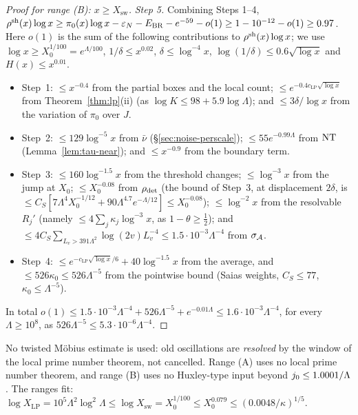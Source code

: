 \begin{proof}[Proof for range \textup{(B)}: $x\ge X_{\mathrm{sw}}$]
\emph{Step 5.} Combining Steps 1--4,
$\rho^{\mathrm{sh}}(x)\log x\ge\pi_0(x)\log x-\varepsilon_N-E_{\mathrm{BR}}-e^{-59}-o(1)\ge1-10^{-12}-o(1)\ge0.97$.
Here $o(1)$ is the sum of the following contributions to $\rho^{\mathrm{sh}}(x)\log x$; we use $\log x\ge X_0^{1/100}=e^{\Lambda/100}$,
$1/\delta\le x^{0.02}$, $\delta\le\log^{-4}x$, $\log(1/\delta)\le0.6\sqrt{\log x}$ and $H(x)\le x^{0.01}$.
\begin{itemize}
\item Step~1: $\le x^{-0.4}$ from the partial boxes and the local count; $\le e^{-0.4c_{\mathrm{LP}}\sqrt{\log x}}$ from
  Theorem~\ref{thm:lp}(ii) (as $\log K\le98+5.9\log\Lambda$); and $\le3\delta/\log x$ from the variation of $\pi_0$ over $J$.
\item Step~2: $\le129\log^{-5}x$ from $\bar\nu$ (\S\ref{sec:noise-perscale}); $\le55e^{-0.99\Lambda}$ from $\mathrm{NT}$
  (Lemma~\ref{lem:tau-near}); and $\le x^{-0.9}$ from the boundary term.
\item Step~3: $\le160\log^{-1.5}x$ from the threshold changes; $\le\log^{-3}x$ from the jump at $X_0$; $\le X_0^{-0.08}$ from
  $\rho_{\mathrm{det}}$ (the bound of Step~3, at displacement $2\delta$, is $\le C_S[7\Lambda^4X_0^{-1/12}+90\Lambda^{4.7}e^{-\Lambda/12}]\le X_0^{-0.08}$);
  $\le\log^{-2}x$ from the resolvable $R_j'$ (namely $\le4\sum_j\kappa_j\log^{-3}x$, as $1-\theta\ge\frac12$); and $\le4C_S\sum_{L_v>391\Lambda^2}\log(2v)L_v^{-4}\le1.5\cdot10^{-3}\Lambda^{-4}$
  from $\sigma_{\mathcal{A}}$.
\item Step~4: $\le e^{-c_{\mathrm{LP}}\sqrt{\log x}/6}+40\log^{-1.5}x$ from the average, and $\le526\kappa_0\le526\Lambda^{-5}$ from
  the pointwise bound (Saias weights, $C_S\le77$, $\kappa_0\le\Lambda^{-5}$).
\end{itemize}
In total $o(1)\le1.5\cdot10^{-3}\Lambda^{-4}+526\Lambda^{-5}+e^{-0.01\Lambda}\le1.6\cdot10^{-3}\Lambda^{-4}$, for every
$\Lambda\ge10^8$, as $526\Lambda^{-5}\le5.3\cdot10^{-6}\Lambda^{-4}$.
\end{proof}

\begin{remark}
No twisted M\"obius estimate is used: old oscillations are \emph{resolved} by the window of the local prime number theorem,
not cancelled. Range (A) uses no local prime number theorem, and range (B) uses no Huxley-type input beyond
$j_0\le1.0001/\Lambda$. The ranges fit: $\log X_{\mathrm{LP}}=10^5\Lambda^2\log^2\Lambda\le\log X_{\mathrm{sw}}=X_0^{1/100}\le X_0^{0.079}
\le(0.0048/\kappa)^{1/5}$.
\end{remark}
